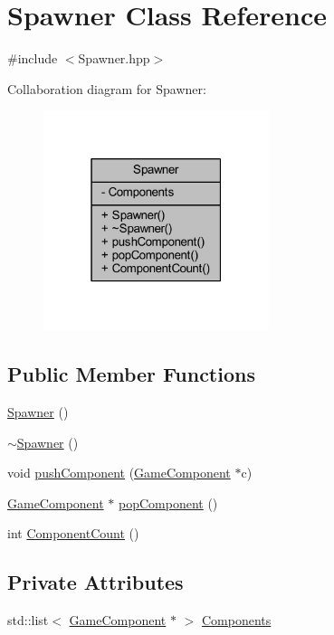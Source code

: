 \hypertarget{class_spawner}{\section{Spawner Class Reference}
\label{class_spawner}
}


{\ttfamily \#include $<$Spawner.\-hpp$>$}



Collaboration diagram for Spawner\-:
\nopagebreak
\begin{figure}[H]
\begin{center}
\leavevmode
\includegraphics[width=187pt]{class_spawner__coll__graph}
\end{center}
\end{figure}
\subsection*{Public Member Functions}
\begin{DoxyCompactItemize}
\item 
\hyperlink{class_spawner_a3e3aa3ccff73556625359e75f64d0dd0}{Spawner} ()
\item 
\hyperlink{class_spawner_a59d8e3d4d6dc6c25f38ce5d4fcc5e8e6}{$\sim$\-Spawner} ()
\item 
void \hyperlink{class_spawner_a56762cb03662152ffb517f44f431599b}{push\-Component} (\hyperlink{class_game_component}{Game\-Component} $\ast$c)
\item 
\hyperlink{class_game_component}{Game\-Component} $\ast$ \hyperlink{class_spawner_a2cb984bed31cef93edcb9dcfc27f47d0}{pop\-Component} ()
\item 
int \hyperlink{class_spawner_a9b6caf4f8e980acd1537050792ab8583}{Component\-Count} ()
\end{DoxyCompactItemize}
\subsection*{Private Attributes}
\begin{DoxyCompactItemize}
\item 
std\-::list$<$ \hyperlink{class_game_component}{Game\-Component} $\ast$ $>$ \hyperlink{class_spawner_ae5e316957ac1574347ba80bac3866976}{Components}
\end{DoxyCompactItemize}


